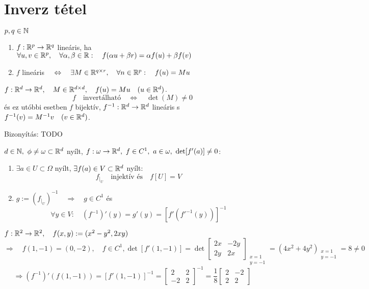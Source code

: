 \documentclass[a4paper,11.5pt]{article}
\begin{document}
	\section{Inverz tétel}
	\begin{revision}
		$p,q\in\mathbb{N}$
		\begin{enumerate}
			\item $f:\mathbb{R}^p\to\mathbb{R}^q$ lineáris, ha $\forall u,v\in\mathbb{R}^p,\quad \forall\alpha,\beta\in\mathbb{R}:\quad f(\alpha u+\beta r)=\alpha f(u)+\beta f(v)$
			\item $f$ lineáris $\quad \Leftrightarrow\quad \exists M\in\mathbb{R}^{q\times r},\quad \forall n\in\mathbb{R}^p:\quad f(u)=Mu$
		\end{enumerate}
	\end{revision}
	\begin{theorem}
		$f:\mathbb{R}^d\to\mathbb{R}^d,\quad M\in\mathbb{R}^{d\times d},\quad f(u)=Mu\quad (u\in\mathbb{R}^d)$.
		\[ f \quad \text{invertálható}\quad \Leftrightarrow\quad \det(M)\not=0 \]
		és ez utóbbi esetben $f$ bijektív, $f^{-1}:\mathbb{R}^d\to\mathbb{R}^d$ lineáris s $f^{-1}(v)=M^{-1}v\quad (v\in\mathbb{R}^d)$.
		
		Bizonyítás: TODO %
	\end{theorem}
	\begin{theorem}
		$d\in\N,\ \phi\not=\omega\subset\R^d$ nyílt, $f:\omega\to\R^d,\ f\in C^1,\ a\in\omega,\ \det[f'(a)]\not=0$:
		\begin{enumerate}
			\item $\exists a\in U\subset\varOmega$ nyílt, $\exists f(a)\in V\subset\mathbb{R}^d$ nyílt:
			\[ f_{\big|_U}\quad \text{injektív és}\quad f[U]=V \]
			\item $g:=\left(f_{\big|_U}\right)^{-1}\quad \Rightarrow\quad g\in C^1$ és
			\[ \forall y\in V:\quad (f^{-1})'(y)=g'(y)=[f'(f'^{-1}(y))]^{-1} \]
		\end{enumerate}
	\end{theorem}
	\begin{example}
		$f:\mathbb{R}^2\to\mathbb{R}^2,\quad f(x,y):=(x^2-y^2, 2xy)$ \[\Rightarrow\quad f(1,-1)=(0,-2),\quad f\in C^1, \det[f'(1,-1)]=\det \begin{bmatrix}
			2x&-2y\\
			2y&2x
		\end{bmatrix}_{\substack{x=1\\y=-1}}=(4x^2+4y^2)_{\substack{x=1\\y=-1}}=8\not=0\]
		\[ \Rightarrow (f^{-1})'(f(1,-1))=[f'(1,-1)]^{-1}=\begin{bmatrix}
			2&2\\
			-2&2
		\end{bmatrix}^{-1}=\frac{1}{8} \begin{bmatrix}
			2&-2\\
			2&2
		\end{bmatrix} \]
	\end{example}
\end{document}

